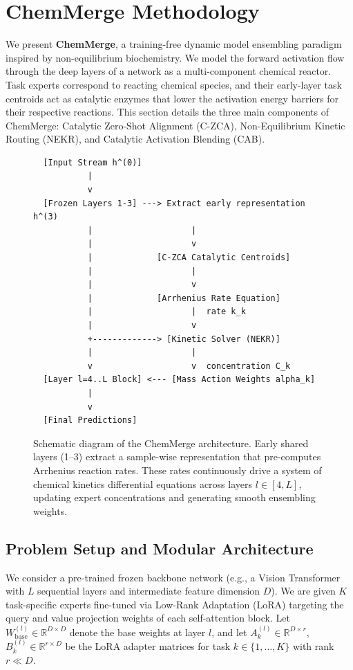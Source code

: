 \section{ChemMerge Methodology}
\label{sec:method}

We present \textbf{ChemMerge}, a training-free dynamic model ensembling paradigm inspired by non-equilibrium biochemistry. We model the forward activation flow through the deep layers of a network as a multi-component chemical reactor. Task experts correspond to reacting chemical species, and their early-layer task centroids act as catalytic enzymes that lower the activation energy barriers for their respective reactions. This section details the three main components of ChemMerge: Catalytic Zero-Shot Alignment (C-ZCA), Non-Equilibrium Kinetic Routing (NEKR), and Catalytic Activation Blending (CAB).

\begin{figure}[h]
  \centering
  \begin{small}
  \begin{verbatim}
  [Input Stream h^(0)] 
           |
           v
  [Frozen Layers 1-3] ---> Extract early representation h^(3)
           |                    |
           |                    v
           |             [C-ZCA Catalytic Centroids]
           |                    |
           |                    v
           |             [Arrhenius Rate Equation]
           |                    |  rate k_k
           |                    v
           +-------------> [Kinetic Solver (NEKR)] 
           |                    |
           v                    v  concentration C_k
  [Layer l=4..L Block] <--- [Mass Action Weights alpha_k]
           |
           v
  [Final Predictions]
  \end{verbatim}
  \end{small}
  \caption{Schematic diagram of the ChemMerge architecture. Early shared layers (1--3) extract a sample-wise representation that pre-computes Arrhenius reaction rates. These rates continuously drive a system of chemical kinetics differential equations across layers $l \in [4, L]$, updating expert concentrations and generating smooth ensembling weights.}
  \label{fig:diagram}
\end{figure}

\subsection{Problem Setup and Modular Architecture}
We consider a pre-trained frozen backbone network (e.g., a Vision Transformer \cite{dosovitskiy20vit} with $L$ sequential layers and intermediate feature dimension $D$). We are given $K$ task-specific experts fine-tuned via Low-Rank Adaptation (LoRA) \cite{hu21lora} targeting the query and value projection weights of each self-attention block. Let $W_{\text{base}}^{(l)} \in \mathbb{R}^{D \times D}$ denote the base weights at layer $l$, and let $A_k^{(l)} \in \mathbb{R}^{D \times r}$, $B_k^{(l)} \in \mathbb{R}^{r \times D}$ be the LoRA adapter matrices for task $k \in \{1, \dots, K\}$ with rank $r \ll D$.

